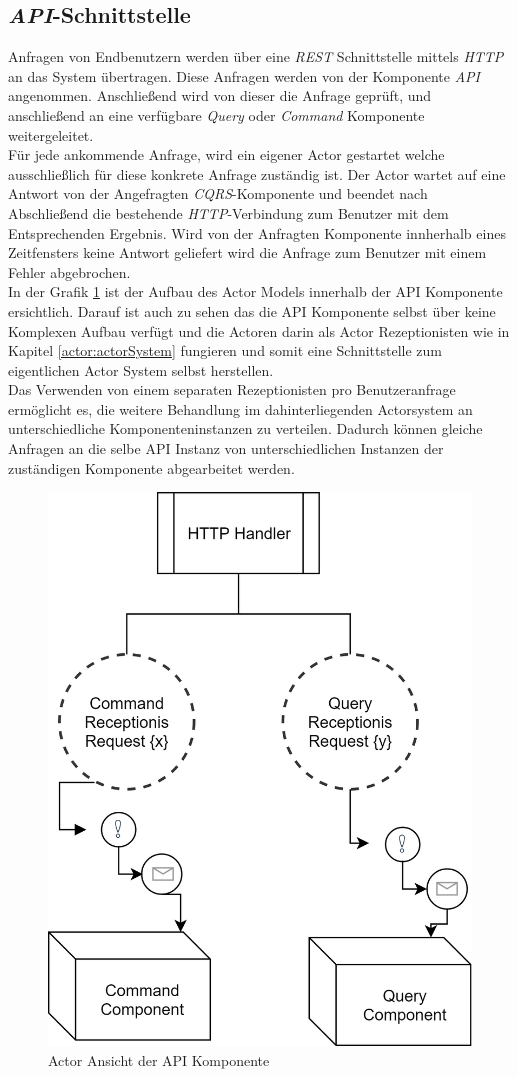 \subsection{\textit{API}-Schnittstelle}
\label{subsec:implementation:apiComponente}
Anfragen von Endbenutzern werden über eine \textit{REST} Schnittstelle mittels \textit{HTTP} an das System übertragen. Diese Anfragen werden von der Komponente \textit{API} angenommen. Anschließend wird von dieser die Anfrage geprüft, und anschließend an eine verfügbare \textit{Query} oder \textit{Command} Komponente weitergeleitet. \\
Für jede ankommende Anfrage, wird ein eigener Actor gestartet welche ausschließlich für diese konkrete Anfrage zuständig ist. Der Actor wartet auf eine Antwort von der Angefragten \textit{CQRS}-Komponente und beendet nach Abschließend die bestehende \textit{HTTP}-Verbindung zum Benutzer mit dem Entsprechenden Ergebnis. Wird von der Anfragten Komponente innherhalb eines Zeitfensters keine Antwort geliefert wird die Anfrage zum Benutzer mit einem Fehler abgebrochen. \\
In der Grafik \ref{fig:implementation:apiActorModel} ist der Aufbau des Actor Models innerhalb der API Komponente ersichtlich. Darauf ist auch zu sehen das die API Komponente selbst über keine Komplexen Aufbau verfügt und die Actoren darin als Actor Rezeptionisten wie in Kapitel \ref{actor:actorSystem} fungieren und somit eine Schnittstelle zum eigentlichen Actor System selbst herstellen. \\
Das Verwenden von einem separaten Rezeptionisten pro Benutzeranfrage ermöglicht es, die weitere Behandlung im dahinterliegenden Actorsystem an unterschiedliche Komponenteninstanzen zu verteilen. Dadurch können gleiche Anfragen an die selbe API Instanz von unterschiedlichen Instanzen der zuständigen Komponente abgearbeitet werden. 
\begin{figure}
    \centering
    \includegraphics[width=0.5\linewidth]{gfx/implementation/apiActorModel}
    \caption{Actor Ansicht der API Komponente}
    \label{fig:implementation:apiActorModel}
\end{figure} 

